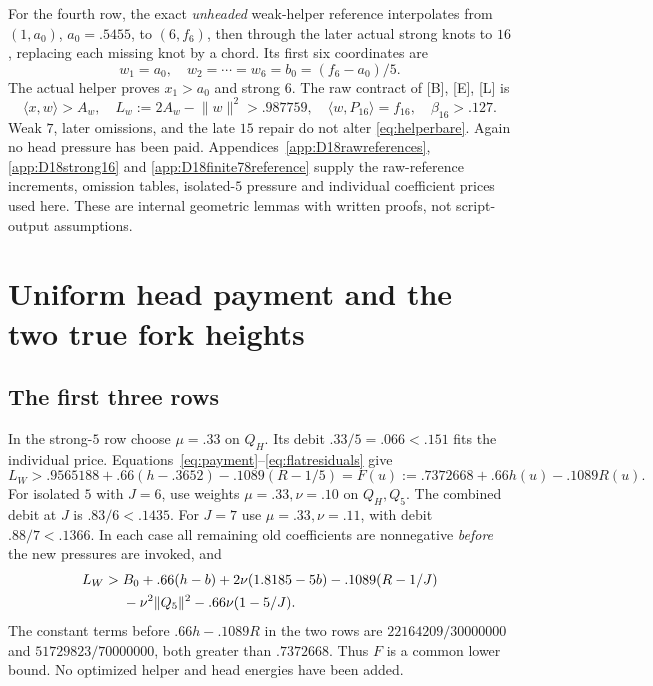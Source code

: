 \documentclass[11pt]{article}
\theoremstyle{definition}
\theoremstyle{remark}
\newcommand{\ip}[2]{\langle #1,#2\rangle}
\newcommand{\norm}[1]{\lVert #1\rVert}
\newcommand{\src}[1]{\textnormal{\textsf{[#1]}}}
\begin{document}
For the fourth row, the exact \emph{unheaded} weak-helper
reference interpolates from
\((1,a_0)\), \(a_0=.5455\), to \((6,f_6)\), then through
the later actual strong knots to \(16\), replacing each missing
knot by a chord. Its first six coordinates are
\begin{equation}
\label{eq:helperbare}
 w_1=a_0,\quad w_2=\cdots=w_6=b_0=(f_6-a_0)/5.
\end{equation}
The actual helper proves \(x_1>a_0\) and strong \(6\).
The raw contract of \src{B}, \src{E}, \src{L} is
\[
 \ip{x}{w}>A_w,\quad L_w:=2A_w-\norm{w}^2>.987759,\quad
 \ip{w}{P_{16}}=f_{16},\quad \beta_{16}>.127.
\]
Weak \(7\), later omissions, and the late \(15\) repair do not
alter \eqref{eq:helperbare}. Again no head pressure has been paid.
Appendices~\ref{app:D18rawreferences}, \ref{app:D18strong16}
and \ref{app:D18finite78reference} supply the raw-reference increments,
omission tables, isolated-\(5\) pressure and individual coefficient
prices used here. These are internal geometric lemmas with written
proofs, not script-output assumptions.

\section{Uniform head payment and the two true fork heights}
\label{sec:uniformhead}

\subsection{The first three rows}
In the strong-\(5\) row choose \(\mu=.33\) on \(Q_H\).
Its debit \(.33/5=.066<.151\) fits the individual price.
Equations~\eqref{eq:payment}--\eqref{eq:flatresiduals} give
\[
 L_W>.9565188+.66(h-.3652)-.1089(R-1/5)
       =F(u):=.7372668+.66h(u)-.1089R(u).
\]
For isolated \(5\) with \(J=6\), use weights
\(\mu=.33,\nu=.10\) on \(Q_H,Q_5\).
The combined debit at \(J\) is \(.83/6<.1435\).
For \(J=7\) use \(\mu=.33,\nu=.11\), with debit
\(.88/7<.1366\). In each case all remaining old coefficients
are nonnegative \emph{before} the new pressures are invoked, and
\begin{align}
\label{eq:isolatedfunding}
 L_W>{}&B_0+.66(h-b)+2\nu(1.8185-5b)
       -.1089(R-1/J)\notag\\
 &-\nu^2\norm{Q_5}^2-.66\nu(1-5/J).
\end{align}
The constant terms before \(.66h-.1089R\) in the two rows are
\(22164209/30000000\) and \(51729823/70000000\), both
greater than \(.7372668\). Thus \(F\) is a common lower bound.
No optimized helper and head energies have been added.
\end{document}

